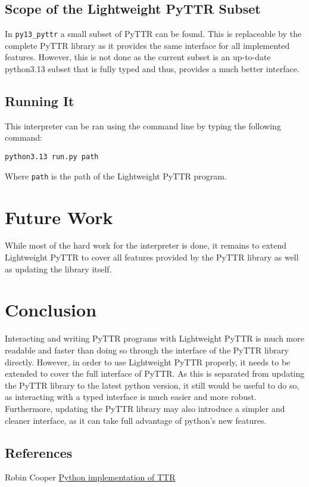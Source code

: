 \documentclass[11pt]{article}
\begin{document}
\subsection{Scope of the Lightweight PyTTR Subset}

In \texttt{py13\_pyttr} a small subset of PyTTR can be found. This is replaceable by the complete PyTTR library as it provides the same interface for all implemented features. However, this is not done as the current subset is an up-to-date python3.13 subset that is fully typed and thus, provides a much better interface.

\subsection{Running It}

This interpreter can be ran using the command line by typing the following command:


\begin{verbatim}
python3.13 run.py path
\end{verbatim}

Where \texttt{path} is the path of the Lightweight PyTTR program.

\section{Future Work}

While most of the hard work for the interpreter is done, it remains to extend Lightweight PyTTR to cover all features provided by the PyTTR library as well as updating the library itself.

\section{Conclusion}

Interacting and writing PyTTR programs with Lightweight PyTTR is much more readable and faster than doing so through the interface of the PyTTR library directly. However, in order to use Lightweight PyTTR properly, it needs to be extended to cover the full interface of PyTTR. As this is separated from updating the PyTTR library to the latest python version, it still would be useful to do so, as interacting with a typed interface is much easier and more robust. Furthermore, updating the PyTTR library may also introduce a simpler and cleaner interface, as it can take full advantage of python's new features.

\subsection{References}

Robin Cooper \href{https://github.com/robincooper/pyttr}{Python implementation of TTR}
\end{document}
